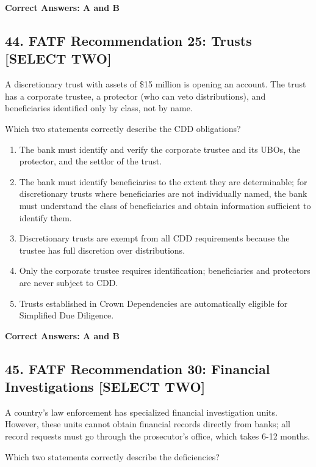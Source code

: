 \documentclass[11pt,a4paper]{article}
\begin{document}
	\textbf{Correct Answers: A and B}
	
	\subsection{44. FATF Recommendation 25: Trusts \textnormal{[SELECT TWO]}}
	
	A discretionary trust with assets of \$15 million is opening an account. The trust has a corporate trustee, a protector (who can veto distributions), and beneficiaries identified only by class, not by name.
	
	Which two statements correctly describe the CDD obligations?
	
	\begin{enumerate}[label=\Alph*.]
		\item The bank must identify and verify the corporate trustee and its UBOs, the protector, and the settlor of the trust.
		\item The bank must identify beneficiaries to the extent they are determinable; for discretionary trusts where beneficiaries are not individually named, the bank must understand the class of beneficiaries and obtain information sufficient to identify them.
		\item Discretionary trusts are exempt from all CDD requirements because the trustee has full discretion over distributions.
		\item Only the corporate trustee requires identification; beneficiaries and protectors are never subject to CDD.
		\item Trusts established in Crown Dependencies are automatically eligible for Simplified Due Diligence.
	\end{enumerate}
	
	\textbf{Correct Answers: A and B}
	
	\subsection{45. FATF Recommendation 30: Financial Investigations \textnormal{[SELECT TWO]}}
	
	A country's law enforcement has specialized financial investigation units. However, these units cannot obtain financial records directly from banks; all record requests must go through the prosecutor's office, which takes 6-12 months.
	
	Which two statements correctly describe the deficiencies?
	
\end{document}

